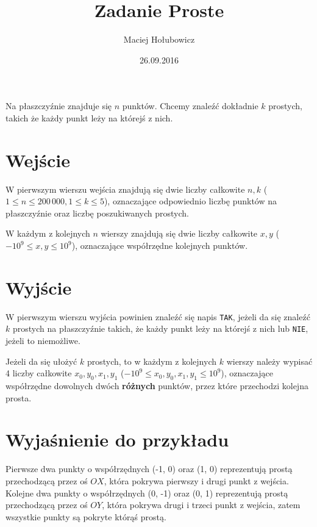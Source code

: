 \documentclass[zad,zawodnik,utf8]{sinol}
\title{Zadanie Proste}
\author{Maciej Hołubowicz} %
\date{26.09.2016}
\begin{document}
\begin{tasktext}%
Na płaszczyźnie znajduje się $n$ punktów. Chcemy znaleźć dokładnie $k$ prostych, takich że każdy punkt leży na którejś z nich.

  \section{Wejście}
W pierwszym wierszu wejścia znajdują się dwie liczby całkowite $n, k$ ($1 \leq n \leq 200\,000, 1 \leq k \leq 5$), oznaczające odpowiednio liczbę punktów na płaszczyźnie
oraz liczbę poszukiwanych prostych.

W każdym z kolejnych $n$ wierszy znajdują się dwie liczby całkowite $x, y$ ($-10^9 \leq x, y \leq 10^9$), oznaczające współrzędne kolejnych punktów.
  
  \section{Wyjście}
W pierwszym wierszu wyjścia powinien znaleźć się napis \texttt{TAK}, jeżeli da się znaleźć $k$ prostych na płaszczyźnie takich, że każdy punkt leży na którejś z nich
lub \texttt{NIE}, jeżeli to niemożliwe.

Jeżeli da się ułożyć $k$ prostych, to w każdym z kolejnych $k$ wierszy należy wypisać 4 liczby całkowite $x_0, y_0, x_1, y_1$ ($-10^9 \leq x_0, y_0, x_1, y_1 \leq 10^9$),
oznaczające współrzędne dowolnych dwóch \textbf{różnych} punktów, przez które przechodzi kolejna prosta.

\makecompactexample

  \section{Wyjaśnienie do przykładu}
Pierwsze dwa punkty o współrzędnych (-1, 0) oraz (1, 0) reprezentują prostą przechodzącą przez oś $OX$, która pokrywa pierwszy i drugi punkt z wejścia.
Kolejne dwa punkty o współrzędnych (0, -1) oraz (0, 1) reprezentują prostą przechodzącą przez oś $OY$, która pokrywa drugi i trzeci punkt z wejścia, zatem
wszystkie punkty są pokryte którąś prostą.

\end{tasktext}
\end{document}
